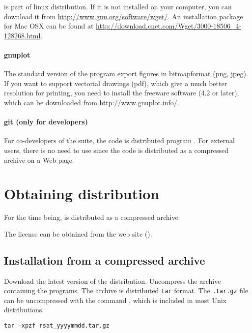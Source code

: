 \documentclass[12pt,a4paper, oneside]{scrreprt} %
\begin{document}
 is part of linux distribution. If it is not installed
on your computer, you can download it from
\url{http://www.gnu.org/software/wget/}.  An installation package for
Mac OSX can be found at
\url{http://download.cnet.com/Wget/3000-18506_4-128268.html}.


\subsubsection{gnuplot}

The standard version of the \RSAT program  export
figures in bitmapformat (png, jpeg). If you want to support vectorial
drawings (pdf), which give a much better resolution for printing, you
need to install the freeware software  (4.2 or
later), which can be downloaded from \url{http://www.gnuplot.info/}.


\subsubsection{git (only for developers)}

For co-developers of the \RSAT suite, the code is distributed program
. For external users, there is no need to use
 since the code is distributed as a compressed archive on
a Web page.


\chapter{Obtaining \RSAT distribution}

For the time being, \RSAT is distributed as a compressed archive. 

The license can be obtained from the \RSAT web site (\rsaturl).

\section{Installation from a compressed archive}

Download the latest version of the \RSAT distribution. Uncompress the
archive containing the programs. The archive is distributed
\texttt{tar} format. The \texttt{.tar.gz} file can be uncompressed
with the command , which is included in most Unix
distributions.

\begin{lstlisting}
tar -xpzf rsat_yyyymmdd.tar.gz
\end{lstlisting}
\end{document}
